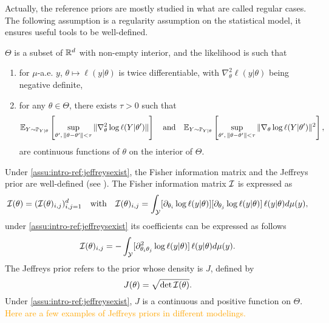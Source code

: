 Actually, the reference priors are mostly studied in what are called regular cases.
The following assumption is a regularity assumption on the statistical model, it ensures useful tools to be well-defined.
\begin{assu}\label{assu:intro-ref:jeffreysexist}
    $\Theta$ is a subset of $\mathbb{R}^d$ with non-empty interior, and the likelihood is such that
    \begin{enumerate}
        \item for $\mu$-a.e. $y$, $\theta\mapsto\ell(y|\theta)$ is twice differentiable, with $\nabla^2_\theta\ell(y|\theta)$ being negative definite,
        \item for any $\theta\in\Theta$, there exists $\tau>0$ %
        such that %
        \begin{equation}
            \mathbb{E}_{Y\sim\mathbb{P}_{Y|\theta}}\left[\sup_{\theta',\,\|\theta-\theta'\|<\tau} \|\nabla^2_\theta\log\ell(Y|\theta')\| \right]\quad\text{and}\quad \mathbb{E}_{Y\sim\mathbb{P}_{Y|\theta}}\left[\sup_{\theta',\,\|\theta-\theta'\|<\tau}\|\nabla_\theta\log\ell(Y|\theta')\|^2\right],
        \end{equation}
        are continuous functions of $\theta$ on the interior of $\Theta$.
    \end{enumerate}
\end{assu}

Under \cref{assu:intro-ref:jeffreysexist}, the Fisher information matrix and the Jeffreys prior are well-defined (see \cite{lehmann_elements_1999}). The Fisher information matrix $\mathcal{I}$ is expressed as
    \begin{equation}
        \mathcal{I}(\theta) = (\mathcal{I}(\theta)_{i,j})_{i,j=1}^d\quad \text{with}\quad \mathcal{I}(\theta)_{i,j}= \int_{\mathcal{Y}}[\partial_{\theta_i}\log\ell(y|\theta)]
        [\partial_{\theta_j}\log\ell(y|\theta)]\, \ell(y|\theta)d\mu(y),
    \end{equation}
under \cref{assu:intro-ref:jeffreysexist} its coefficients can be expressed as follows
    \begin{equation}
       \mathcal{I}(\theta)_{i,j}= - \int_{\mathcal{Y}}[\partial^2_{\theta_i\theta_j}\log\ell(y|\theta)]\, \ell(y|\theta)d\mu(y).
    \end{equation}
The Jeffreys prior refers to the prior whose density is $J$, defined by
    \begin{equation}
        J(\theta) = \sqrt{\det\mathcal{I}(\theta)}.
    \end{equation}
Under \cref{assu:intro-ref:jeffreysexist}, $J$ is a continuous and positive function on $\Theta$. \textcolor{orange}{Here are a few examples of Jeffreys priors in different modelings.}

